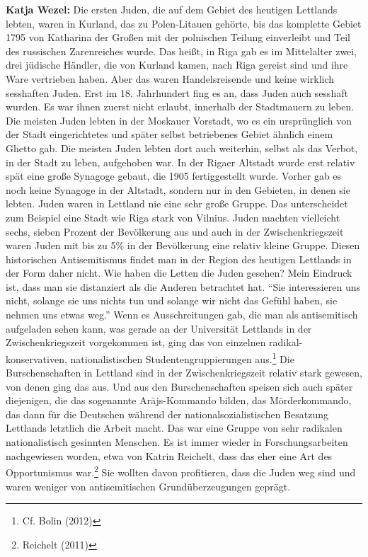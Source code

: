 \textbf{Katja Wezel:} Die ersten Juden, die auf dem Gebiet des heutigen Lettlands lebten, waren in Kurland, das zu Polen-Litauen gehörte, bis das komplette Gebiet 1795 von Katharina der Großen mit der polnischen Teilung einverleibt und Teil des russischen Zarenreiches wurde. Das heißt, in Riga gab es im Mittelalter zwei, drei jüdische Händler, die von Kurland kamen, nach Riga gereist sind und ihre Ware vertrieben haben. Aber das waren Handelsreisende und keine wirklich sesshaften Juden. Erst im 18. Jahrhundert fing es an, dass Juden auch sesshaft wurden. Es war ihnen zuerst nicht erlaubt, innerhalb der Stadtmauern zu leben. Die meisten Juden lebten in der Moskauer Vorstadt, wo es ein ursprünglich von der Stadt eingerichtetes und später selbst betriebenes Gebiet ähnlich einem Ghetto gab. Die meisten Juden lebten dort auch weiterhin, selbst als das Verbot, in der Stadt zu leben, aufgehoben war. In der Rigaer Altstadt wurde erst relativ spät eine große Synagoge gebaut, die 1905 fertiggestellt wurde. Vorher gab es noch keine Synagoge in der Altstadt, sondern nur in den Gebieten, in denen sie lebten. 
Juden waren in Lettland nie eine sehr große Gruppe. Das unterscheidet zum Beispiel eine Stadt wie Riga stark von Vilnius. Juden machten vielleicht sechs, sieben Prozent der Bevölkerung aus und auch in der Zwischenkriegszeit waren Juden mit bis zu 5\% in der Bevölkerung eine relativ kleine Gruppe. Diesen historischen Antisemitismus findet man in der Region des heutigen Lettlands in der Form daher nicht. 
Wie haben die Letten die Juden gesehen? Mein Eindruck ist, dass man sie distanziert als die Anderen betrachtet hat. ``Sie interessieren uns nicht, solange sie uns nichts tun und solange wir nicht das Gefühl haben, sie nehmen uns etwas weg.'' Wenn es Ausschreitungen gab, die man als antisemitisch aufgeladen sehen kann, was gerade an der Universität Lettlands in der Zwischenkriegszeit vorgekommen ist, ging das von einzelnen radikal-konservativen, nationalistischen Studentengruppierungen aus.\footnote{Cf. Bolin (2012)} Die Burschenschaften in Lettland sind in der Zwischenkriegszeit relativ stark gewesen, von denen ging das aus. Und aus den Burschenschaften speisen sich auch später diejenigen, die das sogenannte Arājs-Kommando bilden, das Mörderkommando, das dann für die Deutschen während der nationalsozialistischen Besatzung Lettlands letztlich die Arbeit macht. Das war eine Gruppe von sehr radikalen nationalistisch gesinnten Menschen. Es ist immer wieder in Forschungsarbeiten nachgewiesen worden, etwa von Katrin Reichelt, dass das eher eine Art des Opportunismus war.\footnote{Reichelt (2011)} Sie wollten davon profitieren, dass die Juden weg sind und waren weniger von antisemitischen Grundüberzeugungen geprägt. 

